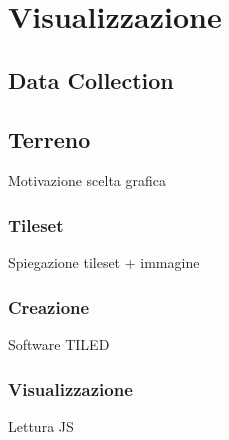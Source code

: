 \section{Visualizzazione}

\subsection{Data Collection}

\subsection{Terreno}
Motivazione scelta grafica

\subsubsection{Tileset}
Spiegazione tileset + immagine

\subsubsection{Creazione}
Software TILED

\subsubsection{Visualizzazione}
Lettura JS